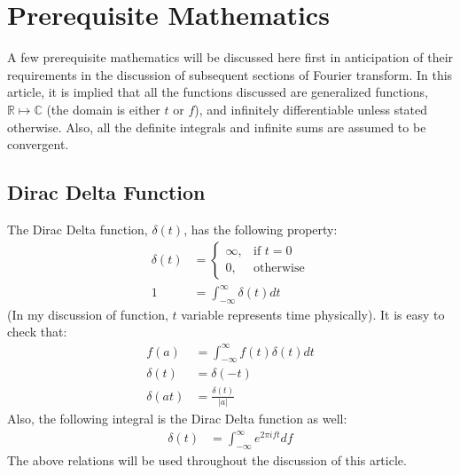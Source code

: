 \documentclass[letterpaper, 11pt]{article}
\newcommand{\fint}{\int_{-\infty}^{\infty}} %
\newcommand{\ift}[3]{\fint #2 e^{2\pi i#1#3} d#1} %
\numberwithin{equation}{section}
\numberwithin{figure}{section}
\numberwithin{table}{section}
\begin{document}
\section{Prerequisite Mathematics}
A few prerequisite mathematics will be discussed here first in anticipation of their requirements in the discussion of subsequent sections of Fourier transform. In this article, it is implied that all the functions discussed are generalized functions, \(\mathbb{R} \mapsto \mathbb{C} \) (the domain is either \(t\) or \(f\)), and infinitely differentiable unless stated otherwise. Also, all the definite integrals and infinite sums are assumed to be convergent.  

\subsection{Dirac Delta Function}
The Dirac Delta function, \(\delta (t)\), has the following property:
\begin{align}
	\delta (t)	&=\begin{cases}
		\infty, & \text{if } t = 0 \\
		0,	& \text{otherwise}
	\end{cases}\\
		1	&= \fint \delta (t) dt
\end{align}
(In my discussion of function, \(t\) variable represents time physically). It is easy to check that:
\begin{align}
	f(a)		&= \fint f(t) \delta (t) dt\\
	\delta (t)	&= \delta (-t)\\
	\delta (at)	&= \frac{\delta (t)}{|a|}
\end{align}
Also, the following integral is the Dirac Delta function as well:
\begin{align}
	\delta (t)	&= \ift{f}{}{t}
	\label{eq:dirac}
\end{align}
The above relations will be used throughout the discussion of this article.

\end{document}
